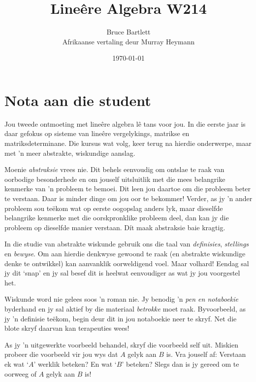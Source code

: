 \documentclass[a4paper,11pt]{book}
\theoremstyle{definition}
\begin{document}
\frontmatter

\author{{\Large Bruce Bartlett}  \\ {\large Afrikaanse vertaling deur
Murray Heymann}}
\title{Line{\^e}re Algebra W214}
\date{\today}



\maketitle
\tableofcontents


\chapter{Nota aan die student}\label{ACh0NoteForStudent}

Jou tweede ontmoeting met line{\^e}re algebra l{\^e} tans voor jou. In die
eerste jaar is daar gefokus op sisteme van line{\^e}re vergelykings,
matrikse en matriksdeterminane. Die kursus wat volg, keer terug na hierdie
onderwerpe, maar met 'n meer abstrakte, wiskundige aanslag.

Moenie \emph{abstraksie} vrees nie. Dit behels eenvoudig om ontslae te raak
van oorbodige besonderhede en om jouself uitsluitlik met die mees
belangrike kenmerke van 'n probleem te bemoei. Dit leen jou daartoe om
die probleem beter te verstaan. Daar is minder dinge om jou oor te
bekommer! Verder, as jy 'n ander probleem sou te{\"e}kom wat op eerste
oogopslag anders lyk, maar dieselfde belangrike kenmerke met die
oorskpronklike probleem deel, dan kan jy die probleem op dieselfde manier
verstaan. Dít maak abstraksie baie kragtig.

In die studie van abstrakte wiskunde gebruik ons die taal van
\emph{definisies}, \emph{stellings} en \emph{bewyse}. Om aan hierdie
denkwyse gewoond te raak (en abstrakte wiskundige denke te ontwikkel) kan
aanvanklik oorweldigend voel. Maar volhard!  Eendag sal jy dit `snap' en jy
sal besef dit is heelwat eenvoudiger as wat jy jou voorgestel het.

Wiskunde word nie gelees soos 'n roman nie. Jy benodig 'n \emph{pen en
notaboekie} byderhand en jy sal aktief by die materiaal \emph{betrokke}
moet raak. Byvoorbeeld, as jy 'n definisie te{\"e}kom, begin deur dit in
jou notaboekie neer te skryf.  Net die blote skryf daarvan kan terapeuties
wees!

As jy 'n uitgewerkte voorbeeld behandel, skryf die voorbeeld self uit.
Miskien probeer die voorbeeld vir jou wys dat $A$ gelyk aan $B$ is. Vra
jouself af:  Verstaan ek wat `$A$' werklik beteken?  En wat `$B$' beteken?
Slegs dan is jy gereed om te oorweeg of $A$ gelyk aan $B$ is!
\end{document}

